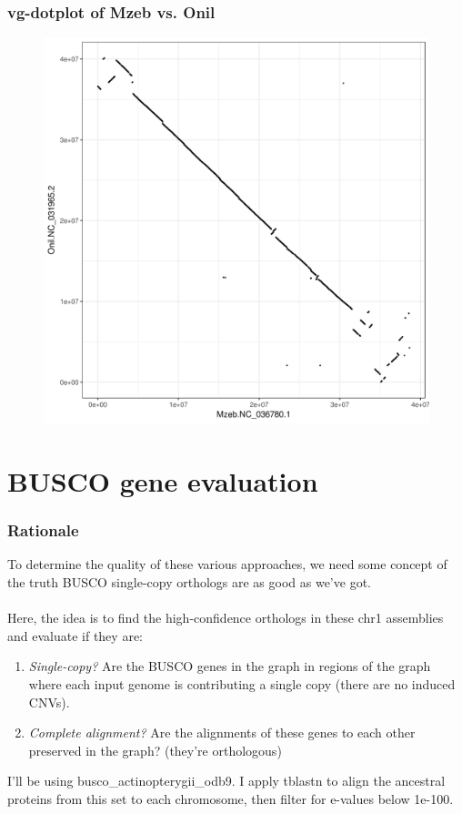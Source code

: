 \documentclass[aspectratio=169]{beamer}
\begin{document}
\begin{frame}
  \frametitle{vg-dotplot of Mzeb vs. Onil}
    \begin{figure}
      \includegraphics[scale=0.45,center]{Mzeb-Onil-dotplot.png}
    \end{figure}
\end{frame}

\section{BUSCO gene evaluation}
\begin{frame}
  \frametitle{Rationale}
  To determine the quality of these various approaches, we need some concept of the truth
  BUSCO single-copy orthologs are as good as we've got.
  \\~\\
  Here, the idea is to find the high-confidence orthologs in these chr1 assemblies and evaluate if they are:
  \begin{enumerate}
  \item \emph{Single-copy?} Are the BUSCO genes in the graph in regions of the graph where each input genome is contributing a single copy (there are no induced CNVs).
  \item \emph{Complete alignment?} Are the alignments of these genes to each other preserved in the graph? (they're orthologous)
  \end{enumerate}
  I'll be using busco\_actinopterygii\_odb9.
  I apply tblastn to align the ancestral proteins from this set to each chromosome, then filter for e-values below 1e-100.
\end{frame}
\end{document}
